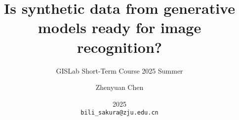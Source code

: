 \documentclass[aspectratio=169]{beamer}
\title[]{Is synthetic data from generative models ready for image recognition?}
\subtitle{GISLab Short-Term Course 2025 Summer}
\author[Sakura]{Zhenyuan Chen}
\institute[ZJU]{School of Earth Science, Zhejiang University}
\date{2025\\\small\texttt{bili\_sakura@zju.edu.cn}}
\begin{document}
\begin{frame}
  \titlepage
\end{frame}


\end{document}
